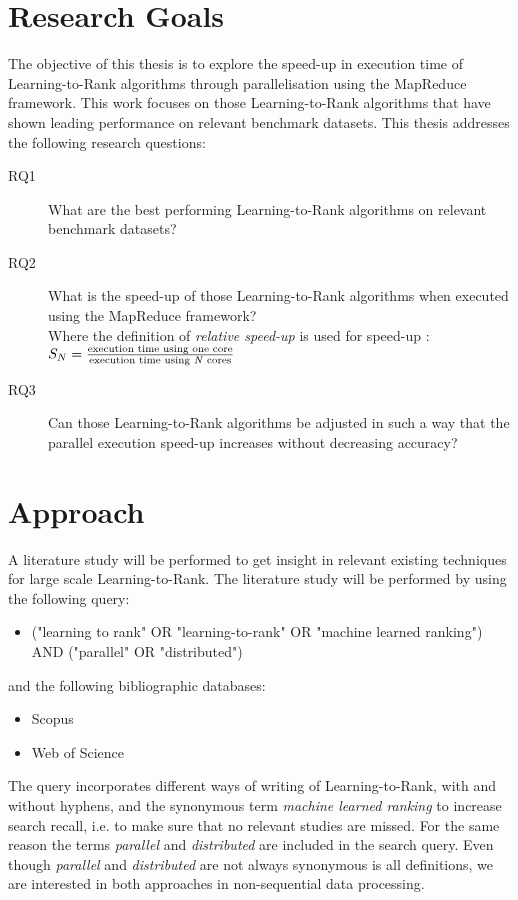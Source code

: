 \chapter{Research Goals}
\label{chap:goals}
The objective of this thesis is to explore the speed-up in execution time of Learning-to-Rank algorithms through parallelisation using the MapReduce framework. 
This work focuses on those Learning-to-Rank algorithms that have shown leading performance on relevant benchmark datasets.
This thesis addresses the following research questions:
\begin{description}
\item[RQ1] What are the best performing Learning-to-Rank algorithms on relevant benchmark datasets?\\

\item[RQ2] What is the speed-up of those Learning-to-Rank algorithms when executed using the MapReduce framework?\\
Where the definition of \emph{relative speed-up} is used for speed-up \cite{Sun1991}:\\

$S_N = \frac{\text{execution time using one core}}{\text{execution time using \emph{N} cores}}$

\item[RQ3] Can those Learning-to-Rank algorithms be adjusted in such a way that the parallel execution speed-up increases without decreasing accuracy?
\end{description}

\chapter{Approach}
A literature study will be performed to get insight in relevant existing techniques for large scale Learning-to-Rank. The literature study will be performed by using the following query:
\begin{itemize}
\item ("learning to rank" OR "learning-to-rank" OR "machine learned ranking") AND ("parallel" OR "distributed")
\end{itemize}
and the following bibliographic databases:
\begin{itemize}
\item Scopus
\item Web of Science
\end{itemize}

The query incorporates different ways of writing of Learning-to-Rank, with and without hyphens, and the synonymous term \emph{machine learned ranking} to increase search recall, i.e. to make sure that no relevant studies are missed. For the same reason the terms \emph{parallel} and \emph{distributed} are included in the search query. Even though \emph{parallel} and \emph{distributed} are not always synonymous is all definitions, we are interested in both approaches in non-sequential data processing.\\

